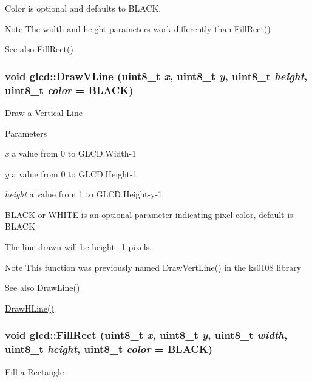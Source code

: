 Color is optional and defaults to BLACK.

\begin{DoxyNote}{Note}
The width and height parameters work differently than \hyperlink{classglcd_ac3ee3809429b633e17734b0b8ca7d010}{FillRect()}
\end{DoxyNote}
\begin{DoxySeeAlso}{See also}
\hyperlink{classglcd_ac3ee3809429b633e17734b0b8ca7d010}{FillRect()} 
\end{DoxySeeAlso}
\hypertarget{classglcd_a93adb4256767b495b15fb326d6d2c01a}{
\subsubsection[{DrawVLine}]{\setlength{\rightskip}{0pt plus 5cm}void glcd::DrawVLine (uint8\_\-t {\em x}, \/  uint8\_\-t {\em y}, \/  uint8\_\-t {\em height}, \/  uint8\_\-t {\em color} = {\ttfamily BLACK})}}
\label{classglcd_a93adb4256767b495b15fb326d6d2c01a}
Draw a Vertical Line


\begin{DoxyParams}{Parameters}
\item[{\em x}]a value from 0 to GLCD.Width-\/1 \item[{\em y}]a value from 0 to GLCD.Height-\/1 \item[{\em height}]a value from 1 to GLCD.Height-\/y-\/1\end{DoxyParams}
BLACK or WHITE is an optional parameter indicating pixel color, default is BLACK

The line drawn will be height+1 pixels.

\begin{DoxyNote}{Note}
This function was previously named DrawVertLine() in the ks0108 library
\end{DoxyNote}
\begin{DoxySeeAlso}{See also}
\hyperlink{classglcd_a2995efe72f737e151794898d0f3f784f}{DrawLine()} 

\hyperlink{classglcd_ad44a983103e20535558b69ba15504493}{DrawHLine()} 
\end{DoxySeeAlso}
\hypertarget{classglcd_ac3ee3809429b633e17734b0b8ca7d010}{
\subsubsection[{FillRect}]{\setlength{\rightskip}{0pt plus 5cm}void glcd::FillRect (uint8\_\-t {\em x}, \/  uint8\_\-t {\em y}, \/  uint8\_\-t {\em width}, \/  uint8\_\-t {\em height}, \/  uint8\_\-t {\em color} = {\ttfamily BLACK})}}
\label{classglcd_ac3ee3809429b633e17734b0b8ca7d010}
Fill a Rectangle


